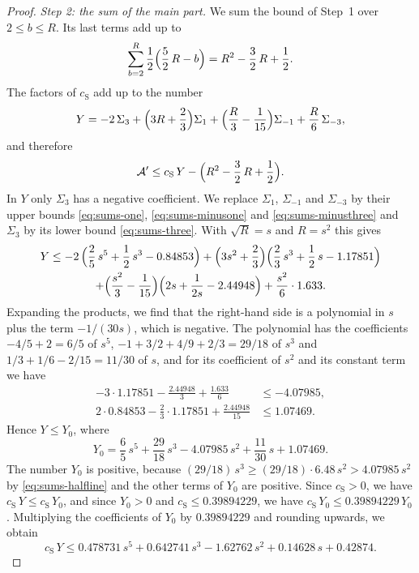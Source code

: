 \documentclass{amsart}
\theoremstyle{definition}
\theoremstyle{remark}
\numberwithin{equation}{section}
\begin{document}
\begin{proof}
\emph{Step 2: the sum of the main part.}
We sum the bound of Step~1 over $2\le b\le R$. Its last terms add up to
\[
\sum_{b=2}^{R}\frac12\Bigl(\frac52\,R-b\Bigr)=R^2-\frac32\,R+\frac12 .
\]
The factors of $c_{\mathrm S}$ add up to the number
\[
Y=-2\,\Sigma_3+\Bigl(3R+\frac23\Bigr)\Sigma_1
+\Bigl(\frac R3-\frac1{15}\Bigr)\Sigma_{-1}+\frac R6\,\Sigma_{-3} ,
\]
and therefore
\[
\mathcal A'\le c_{\mathrm S}\,Y-\Bigl(R^2-\frac32\,R+\frac12\Bigr).
\]
In $Y$ only $\Sigma_3$ has a negative coefficient. We replace $\Sigma_1$,
$\Sigma_{-1}$ and $\Sigma_{-3}$ by their upper bounds \eqref{eq:sums-one},
\eqref{eq:sums-minusone} and \eqref{eq:sums-minusthree} and $\Sigma_3$ by
its lower bound \eqref{eq:sums-three}. With $\sqrt R=s$ and $R=s^2$ this
gives
\begin{multline*}
Y\le-2\,\Bigl(\frac25\,s^5+\frac12\,s^3-0.84853\Bigr)
+\Bigl(3s^2+\frac23\Bigr)\Bigl(\frac23\,s^3+\frac12\,s-1.17851\Bigr)\\
+\Bigl(\frac{s^2}3-\frac1{15}\Bigr)\Bigl(2s+\frac1{2s}-2.44948\Bigr)
+\frac{s^2}6\cdot1.633 .
\end{multline*}
Expanding the products, we find that the right-hand side is a polynomial in
$s$ plus the term $-1/(30s)$, which is negative. The polynomial has the
coefficients $-4/5+2=6/5$ of $s^5$, $-1+3/2+4/9+2/3=29/18$ of $s^3$ and
$1/3+1/6-2/15=11/30$ of $s$, and for
its coefficient of $s^2$ and its constant term we have
\begin{align*}
-3\cdot1.17851-\frac{2.44948}3+\frac{1.633}6&\le-4.07985,\\
2\cdot0.84853-\frac23\cdot1.17851+\frac{2.44948}{15}&\le1.07469 .
\end{align*}
Hence $Y\le Y_0$, where
\[
Y_0=\frac65\,s^5+\frac{29}{18}\,s^3-4.07985\,s^2+\frac{11}{30}\,s
+1.07469 .
\]
The number $Y_0$ is positive, because
$(29/18)\,s^3\ge(29/18)\cdot6.48\,s^2>4.07985\,s^2$ by
\eqref{eq:sums-halfline} and the other terms of $Y_0$ are positive. Since
$c_{\mathrm S}>0$, we have $c_{\mathrm S}\,Y\le c_{\mathrm S}\,Y_0$, and
since $Y_0>0$ and $c_{\mathrm S}\le0.39894229$, we have
$c_{\mathrm S}\,Y_0\le0.39894229\,Y_0$. Multiplying the coefficients of
$Y_0$ by $0.39894229$ and rounding upwards, we obtain
\[
c_{\mathrm S}\,Y
\le0.478731\,s^5+0.642741\,s^3-1.62762\,s^2+0.14628\,s+0.42874 .
\]


\end{proof}
\end{document}
